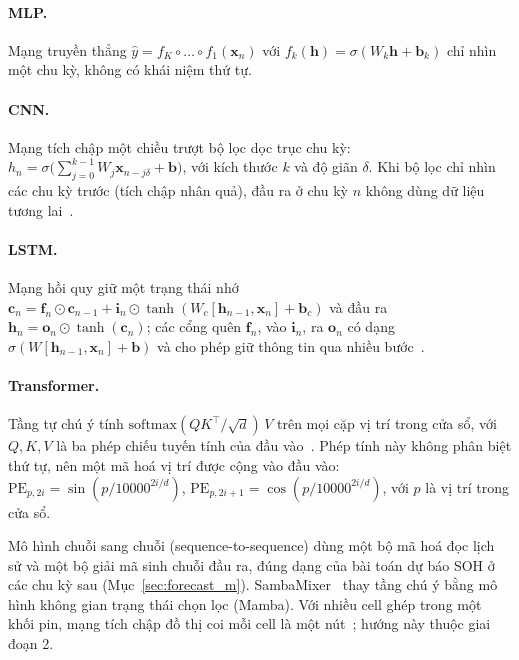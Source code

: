 \documentclass[12pt,a4paper,oneside]{report}
\theoremstyle{plain}
\theoremstyle{definition}
\begin{document}
\paragraph{MLP.} Mạng truyền thẳng $\hat y = f_K \circ \dots \circ f_1(\mathbf{x}_n)$ với
$f_k(\mathbf{h}) = \sigma(W_k \mathbf{h} + \mathbf{b}_k)$ chỉ nhìn một chu kỳ, không có khái niệm thứ tự.

\paragraph{CNN.} Mạng tích chập một chiều trượt bộ lọc dọc trục chu kỳ:
$h_n = \sigma\bigl(\sum_{j=0}^{k-1} W_j \mathbf{x}_{n - j\delta} + \mathbf{b}\bigr)$, với kích thước $k$ và độ giãn
$\delta$. Khi bộ lọc chỉ nhìn các chu kỳ trước (tích chập nhân quả), đầu ra ở chu kỳ $n$ không dùng dữ liệu tương
lai~\cite{bai2018tcn}.

\paragraph{LSTM.} Mạng hồi quy giữ một trạng thái nhớ $\mathbf{c}_n = \mathbf{f}_n \odot \mathbf{c}_{n-1} +
\mathbf{i}_n \odot \tanh(W_c[\mathbf{h}_{n-1}, \mathbf{x}_n] + \mathbf{b}_c)$ và đầu ra $\mathbf{h}_n = \mathbf{o}_n
\odot \tanh(\mathbf{c}_n)$; các cổng quên $\mathbf{f}_n$, vào $\mathbf{i}_n$, ra $\mathbf{o}_n$ có dạng
$\sigma(W[\mathbf{h}_{n-1}, \mathbf{x}_n] + \mathbf{b})$ và cho phép giữ thông tin qua nhiều bước~\cite{hochreiter1997}.

\paragraph{Transformer.} Tầng tự chú ý tính $\mathrm{softmax}(QK^\top / \sqrt{d})\,V$ trên mọi cặp vị trí trong cửa sổ,
với $Q, K, V$ là ba phép chiếu tuyến tính của đầu vào~\cite{vaswani2017}. Phép tính này không phân biệt thứ tự, nên
một mã hoá vị trí được cộng vào đầu vào: $\mathrm{PE}_{p,2i} = \sin(p / 10000^{2i/d})$,
$\mathrm{PE}_{p,2i+1} = \cos(p / 10000^{2i/d})$, với $p$ là vị trí trong cửa sổ.

Mô hình chuỗi sang chuỗi (sequence-to-sequence) dùng một bộ mã hoá đọc lịch sử và một bộ giải mã sinh chuỗi đầu ra,
đúng dạng của bài toán dự báo SOH ở các chu kỳ sau (Mục~\ref{sec:forecast_m}). SambaMixer~\cite{olalde2024samba} thay
tầng chú ý bằng mô hình không gian trạng thái chọn lọc (Mamba). Với nhiều cell ghép trong một khối pin, mạng tích chập
đồ thị coi mỗi cell là một nút~\cite{kipf2017}; hướng này thuộc giai đoạn 2.
\end{document}
